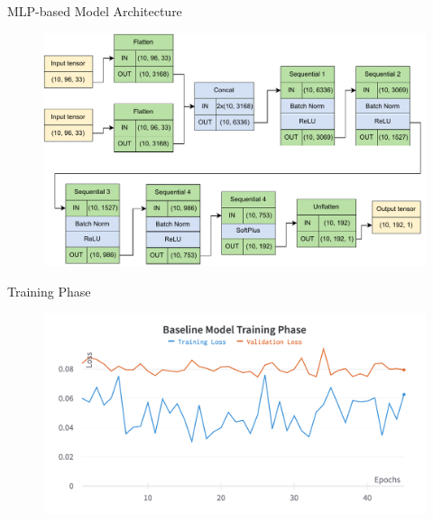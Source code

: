   \begin{frame}{MLP-based Model Architecture}
      \begin{figure}
          \centering
          \includegraphics[width=.9\textwidth]{sections/4_models/imgs/mlp/mlparchitecture.pdf}
      \end{figure}
  \end{frame}

  \begin{frame}{Training Phase}
      \begin{figure}
          \centering
          \includegraphics[width=\textwidth]{sections/4_models/imgs/mlp/ufnctraining.png}
      \end{figure}
  \end{frame}


%              
  
